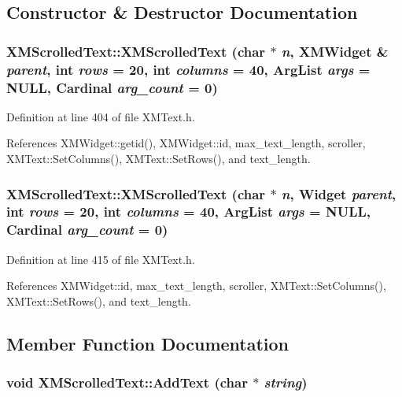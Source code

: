 \subsection{Constructor \& Destructor Documentation}
\subsubsection{\setlength{\rightskip}{0pt plus 5cm}XMScrolled\-Text::XMScrolled\-Text (char $\ast$ {\em n}, {\bf XMWidget} \& {\em parent}, int {\em rows} = 20, int {\em columns} = 40, Arg\-List {\em args} = NULL, Cardinal {\em arg\_\-count} = 0)\hspace{0.3cm}{\tt  [inline]}}\label{classXMScrolledText_a0}




Definition at line 404 of file XMText.h.

References XMWidget::getid(), XMWidget::id, max\_\-text\_\-length, scroller, XMText::Set\-Columns(), XMText::Set\-Rows(), and text\_\-length.
\subsubsection{\setlength{\rightskip}{0pt plus 5cm}XMScrolled\-Text::XMScrolled\-Text (char $\ast$ {\em n}, Widget {\em parent}, int {\em rows} = 20, int {\em columns} = 40, Arg\-List {\em args} = NULL, Cardinal {\em arg\_\-count} = 0)\hspace{0.3cm}{\tt  [inline]}}\label{classXMScrolledText_a1}




Definition at line 415 of file XMText.h.

References XMWidget::id, max\_\-text\_\-length, scroller, XMText::Set\-Columns(), XMText::Set\-Rows(), and text\_\-length.

\subsection{Member Function Documentation}
\subsubsection{\setlength{\rightskip}{0pt plus 5cm}void XMScrolled\-Text::Add\-Text (char $\ast$ {\em string})\hspace{0.3cm}{\tt  [inline]}}\label{classXMScrolledText_a4}




